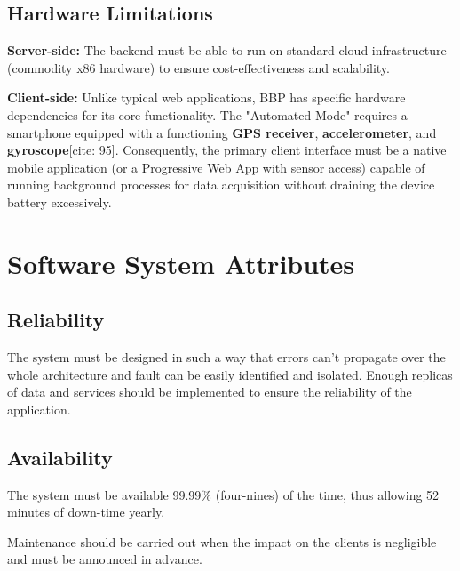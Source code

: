 \subsection{Hardware Limitations}
\label{subsec:hardware-limitations}

\par \textbf{Server-side:} The backend must be able to run on standard cloud infrastructure (commodity x86 hardware) to ensure cost-effectiveness and scalability.

\par \textbf{Client-side:} Unlike typical web applications, BBP has specific hardware dependencies for its core functionality. The "Automated Mode" requires a smartphone equipped with a functioning \textbf{GPS receiver}, \textbf{accelerometer}, and \textbf{gyroscope}[cite: 95]. Consequently, the primary client interface must be a native mobile application (or a Progressive Web App with sensor access) capable of running background processes for data acquisition without draining the device battery excessively.

\pagebreak

\section{Software System Attributes}
\label{sec:software-system-attributes}%

\subsection{Reliability}
\label{subsec:reliability}%

\par The system must be designed in such a way that errors can’t propagate over the whole architecture and fault can be
easily identified and isolated. Enough replicas of data and services should be implemented to ensure the reliability of
the application.

\subsection{Availability}
\label{subsec:availability}%

\par The system must be available 99.99\% (four-nines) of the time, thus allowing 52 minutes of down-time yearly.

\par Maintenance should be carried out when the impact on the clients is negligible and must be announced in advance.

